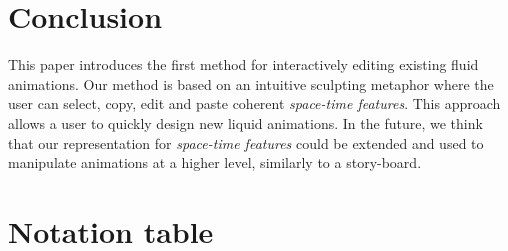 \documentclass[review]{acmsiggraph}
\begin{document}
\section{Conclusion} \label{sec:conclusion}

This paper introduces the first method for interactively editing existing fluid animations.
Our method is based on an intuitive sculpting metaphor where the user can select, copy, edit and paste coherent \emph{space-time features}. 
This approach allows a user to quickly design new liquid animations. 
In the future, we think that our representation for \emph{space-time features} could be extended and used to manipulate animations at a higher level, similarly to a story-board. 





\newpage

\appendix

\section{Notation table}
\label{sec:notations}
\end{document}
